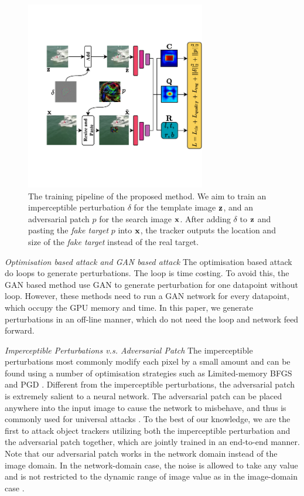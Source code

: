\documentclass[journal]{IEEEtran}
\begin{document}
\begin{figure}[t]
  \centering
  \includegraphics[width=0.7\textwidth]{images/network_v5.pdf}
  \caption{The training pipeline of the proposed method. We aim to train an imperceptible perturbation $\delta$ for the template image $\textbf z$, and an adversarial patch $p$ for the search image $\textbf x$. After adding $\delta$ to $\textbf z$ and pasting the \textit{fake target} $p$ into $\textbf x$, the tracker outputs the location and size of the \textit{fake target} instead of the real target.}
  \label{fig:net}
\end{figure}

\textit{Optimisation based attack and GAN based attack} The optimisation based attack do loops to generate perturbations. The loop is time costing. To avoid this, the GAN based method use GAN to generate perturbation for one datapoint without loop. However, these methods need to run a GAN network for every datapoint, which occupy the GPU memory and time. In this paper, we generate perturbations in an off-line manner, which do not need the loop and network feed forward.

\textit{Imperceptible Perturbations v.s. Adversarial Patch} The imperceptible perturbations most commonly modify each pixel by a small amount and can be found using a number of optimisation strategies such as Limited-memory BFGS \cite{intriguing} and PGD \cite{PGD}.
Different from the imperceptible perturbations, the adversarial patch is extremely salient to a neural network. The adversarial patch can be placed anywhere into the input image to cause the network to misbehave, and thus is commonly used for universal attacks \cite{patch}.
To the best of our knowledge, we are the first to attack object trackers utilizing both the imperceptible perturbation and the adversarial patch together, which are jointly trained in an end-to-end manner.
Note that our adversarial patch works in the network domain instead of the image domain. In the network-domain case, the noise is allowed to take any value and is not restricted to the dynamic range of image value as in the image-domain case \cite{karmon2018lavan}.
\end{document}
